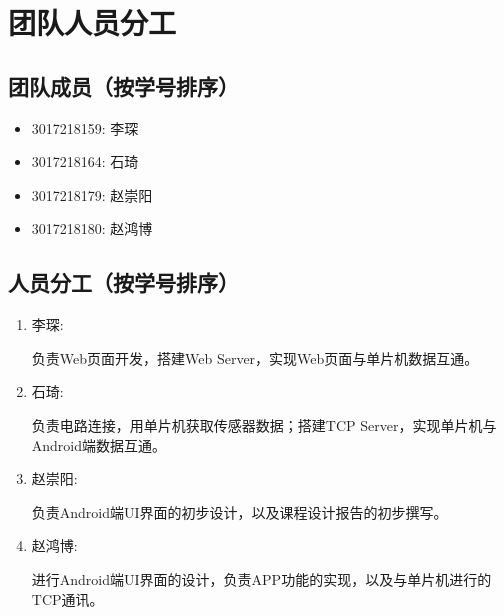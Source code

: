 
\chapter{团队人员分工}
\section{团队成员（按学号排序）}
\begin{itemize}
    \item {3017218159}: 李琛
    \item {3017218164}: 石琦
    \item {3017218179}: 赵崇阳
    \item {3017218180}: 赵鸿博
\end{itemize}
\section{人员分工（按学号排序）}
\begin{enumerate}
    \item {李琛}: 
    
        负责Web页面开发，搭建Web Server，实现Web页面与单片机数据互通。
    \item {石琦}: 
    
        负责电路连接，用单片机获取传感器数据；搭建TCP Server，实现单片机与Android端数据互通。
    \item {赵崇阳}: 
    
        负责Android端UI界面的初步设计，以及课程设计报告的初步撰写。
    \item {赵鸿博}: 
    
        进行Android端UI界面的设计，负责APP功能的实现，以及与单片机进行的TCP通讯。
\end{enumerate}